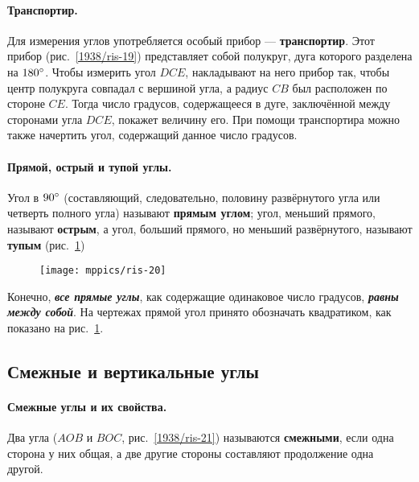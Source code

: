 \paragraph{Транспортир.}\label{1938/20}
Для измерения углов употребляется особый прибор — \textbf{транспортир}.
Этот прибор (рис.~\ref{1938/ris-19}) представляет собой полукруг, дуга которого разделена на $180\degree $.
Чтобы измерить угол $DCE$, накладывают на него прибор так, чтобы центр полукруга совпадал с вершиной угла, а радиус $CB$ был расположен по стороне $CE$.
Тогда число градусов, содержащееся в дуге, заключённой между сторонами угла $DCE$, покажет величину его.
При помощи транспортира можно также начертить угол, содержащий данное число градусов.

\paragraph{Прямой, острый и тупой углы.}\label{1938/21}
Угол в $90\degree$ (составляющий, следовательно, половину развёрнутого угла или четверть полного угла) называют \textbf{прямым углом};
угол, меньший прямого, называют \textbf{острым}, а угол, больший прямого, но меньший развёрнутого, называют \textbf{тупым} (рис.~\ref{1938/ris-20})

\begin{figure}[h!]
\centering
\texttt{[image: mppics/ris-20]}
\caption{}\label{1938/ris-20}
\end{figure}

Конечно, \textbf{\emph{все прямые углы}}, как содержащие одинаковое число градусов, \textbf{\emph{равны между собой}}.
На чертежах прямой угол принято обозначать квадратиком, как показано на рис.~\ref{1938/ris-20}.

\subsection*{Смежные и вертикальные углы}



\paragraph{Смежные углы и их свойства.}\label{1938/22}
Два угла ($AOB$ и $BOC$, рис.~\ref{1938/ris-21}) называются \textbf{смежными}, если одна сторона у них общая, а две другие стороны составляют продолжение одна другой.


